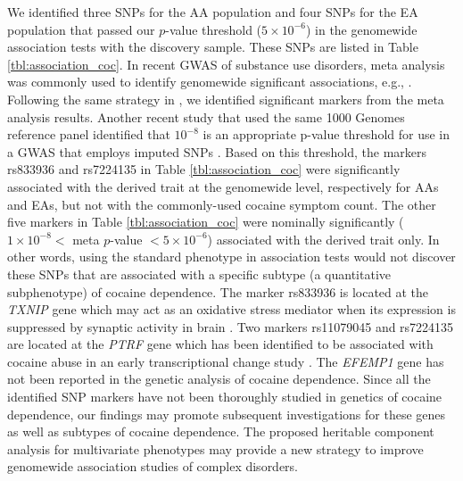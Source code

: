 \documentclass[10pt,letterpaper]{article}
\begin{document}
We identified three SNPs for the AA population and four SNPs for the EA population that passed our $p$-value threshold ($5\times 10^{-6}$) in the genomewide association tests with the discovery sample. These SNPs are listed in Table \ref{tbl:association_coc}. In recent GWAS of substance use disorders, meta analysis was commonly used to identify genomewide significant associations, e.g., \cite{Gelernter:AD:2014,Gelernter:CD:2014,Gelernter:OD:2014}. Following the same strategy in \cite{Gelernter:CD:2014}, we identified significant markers from the meta analysis results. Another recent study that used the same 1000 Genomes reference panel identified that $10^{-8}$ is an appropriate p-value threshold for use in a GWAS that employs imputed SNPs \cite{muli:test:crt:li:2012}. Based on this threshold, the markers rs833936 and rs7224135 in Table \ref{tbl:association_coc} were significantly associated with the derived trait at the genomewide level, respectively for AAs and EAs, but not with the commonly-used cocaine symptom count. The other five markers in Table \ref{tbl:association_coc} were nominally significantly ($1\times 10^{-8}<$ meta $p$-value $< 5\times 10^{-6}$) associated with the derived trait only. In other words, using the standard phenotype in association tests would not discover these SNPs that are associated with a specific subtype (a quantitative subphenotype) of cocaine dependence. The marker rs833936 is located at the  {\em TXNIP} gene which may act as an oxidative stress mediator when its expression is suppressed by synaptic activity in brain \cite{Karen:2009}. Two markers rs11079045 and rs7224135 are located at the {\em PTRF} gene which has been identified to be associated with cocaine abuse in an early transcriptional change study \cite{Lehrmann:Elin:2006}. The {\em EFEMP1} gene has not been reported in the genetic analysis of cocaine dependence. Since all the identified SNP markers have not been thoroughly studied in genetics of cocaine dependence, our findings may promote subsequent investigations for these genes as well as subtypes of cocaine dependence. The proposed heritable component analysis for multivariate phenotypes may provide a new strategy to improve genomewide association studies of complex disorders.
\end{document}
